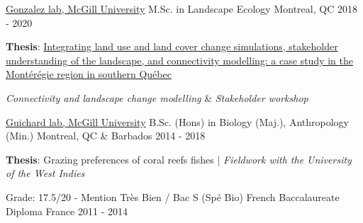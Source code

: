 

\begin{cventries}

  \cventry
    {\href{http://gonzalezlab.weebly.com/}{Gonzalez lab, McGill University}} %
    {M.Sc. in Landscape Ecology} %
    {Montreal, QC} %
    {2018 - 2020} %
    {
      \begin{cvitems} %
        \item {\textbf{Thesis}: \href{https://escholarship.mcgill.ca/concern/theses/mw22vb318?locale=en}{Integrating land use and land cover change simulations, stakeholder understanding of the landscape, and connectivity modelling: a case study in the Montérégie region in southern Québec}}
        \item {\textit{Connectivity and landscape change modelling}  \& \textit{Stakeholder workshop}}
      \end{cvitems}
    }


    \cventry
    {\href{https://guichardlab.weebly.com/cv.html}{Guichard lab, McGill University}} %
    {B.Sc. (Hons) in Biology (Maj.), Anthropology (Min.)} %
    {Montreal, QC \& Barbados} %
    {2014 - 2018} %
    {
      \begin{cvitems} %
        \item {\textbf{Thesis}: Grazing preferences of coral reefs fishes | \textit{Fieldwork with the University of the West Indies}}
      \end{cvitems}
    }

    \cventry
    {Grade: 17.5/20 - Mention Très Bien / Bac S (Spé Bio)} %
    {French Baccalaureate Diploma} %
    {France} %
    {2011 - 2014} %
    {}

\end{cventries}
